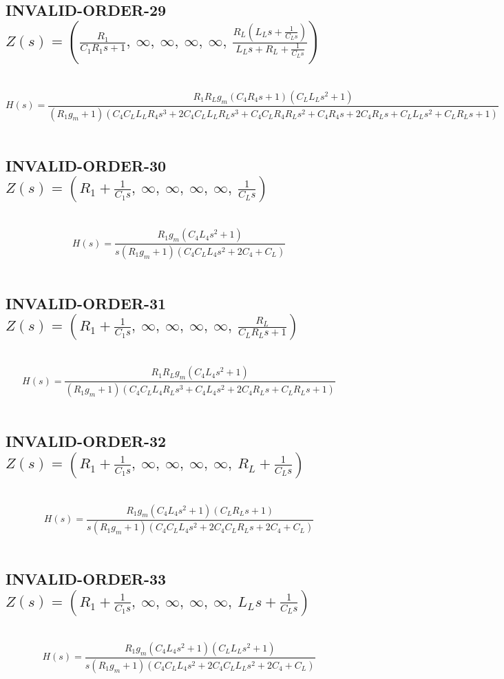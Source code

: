 \documentclass{article}
\begin{document}
\subsection{INVALID-ORDER-29 $Z(s) = \left( \frac{R_{1}}{C_{1} R_{1} s + 1}, \  \infty, \  \infty, \  \infty, \  \infty, \  \frac{R_{L} \left(L_{L} s + \frac{1}{C_{L} s}\right)}{L_{L} s + R_{L} + \frac{1}{C_{L} s}}\right)$ } \ 
\textbf{\[H(s) = \frac{R_{1} R_{L} g_{m} \left(C_{4} R_{4} s + 1\right) \left(C_{L} L_{L} s^{2} + 1\right)}{\left(R_{1} g_{m} + 1\right) \left(C_{4} C_{L} L_{L} R_{4} s^{3} + 2 C_{4} C_{L} L_{L} R_{L} s^{3} + C_{4} C_{L} R_{4} R_{L} s^{2} + C_{4} R_{4} s + 2 C_{4} R_{L} s + C_{L} L_{L} s^{2} + C_{L} R_{L} s + 1\right)}\] } \ 
\subsection{INVALID-ORDER-30 $Z(s) = \left( R_{1} + \frac{1}{C_{1} s}, \  \infty, \  \infty, \  \infty, \  \infty, \  \frac{1}{C_{L} s}\right)$ } \ 
\textbf{\[H(s) = \frac{R_{1} g_{m} \left(C_{4} L_{4} s^{2} + 1\right)}{s \left(R_{1} g_{m} + 1\right) \left(C_{4} C_{L} L_{4} s^{2} + 2 C_{4} + C_{L}\right)}\] } \ 
\subsection{INVALID-ORDER-31 $Z(s) = \left( R_{1} + \frac{1}{C_{1} s}, \  \infty, \  \infty, \  \infty, \  \infty, \  \frac{R_{L}}{C_{L} R_{L} s + 1}\right)$ } \ 
\textbf{\[H(s) = \frac{R_{1} R_{L} g_{m} \left(C_{4} L_{4} s^{2} + 1\right)}{\left(R_{1} g_{m} + 1\right) \left(C_{4} C_{L} L_{4} R_{L} s^{3} + C_{4} L_{4} s^{2} + 2 C_{4} R_{L} s + C_{L} R_{L} s + 1\right)}\] } \ 
\subsection{INVALID-ORDER-32 $Z(s) = \left( R_{1} + \frac{1}{C_{1} s}, \  \infty, \  \infty, \  \infty, \  \infty, \  R_{L} + \frac{1}{C_{L} s}\right)$ } \ 
\textbf{\[H(s) = \frac{R_{1} g_{m} \left(C_{4} L_{4} s^{2} + 1\right) \left(C_{L} R_{L} s + 1\right)}{s \left(R_{1} g_{m} + 1\right) \left(C_{4} C_{L} L_{4} s^{2} + 2 C_{4} C_{L} R_{L} s + 2 C_{4} + C_{L}\right)}\] } \ 
\subsection{INVALID-ORDER-33 $Z(s) = \left( R_{1} + \frac{1}{C_{1} s}, \  \infty, \  \infty, \  \infty, \  \infty, \  L_{L} s + \frac{1}{C_{L} s}\right)$ } \ 
\textbf{\[H(s) = \frac{R_{1} g_{m} \left(C_{4} L_{4} s^{2} + 1\right) \left(C_{L} L_{L} s^{2} + 1\right)}{s \left(R_{1} g_{m} + 1\right) \left(C_{4} C_{L} L_{4} s^{2} + 2 C_{4} C_{L} L_{L} s^{2} + 2 C_{4} + C_{L}\right)}\] } \ 
\end{document}
